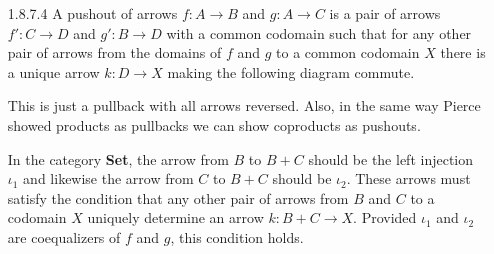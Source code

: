 \documentclass{article}
\begin{document}
\begin{enumerate}
\newpage
\item [1.8.7.4]
  A pushout of arrows $f : A \rightarrow B$ and $g : A \rightarrow C$ is a pair of arrows $f' : C \rightarrow D$ and $g' : B \rightarrow D$ with a common codomain such that for any other pair of arrows from the domains of $f$ and $g$ to a common codomain $X$ there is a unique arrow $k : D \rightarrow X$ making the following diagram commute.
  \begin{center}
  \end{center}

  This is just a pullback with all arrows reversed.
  Also, in the same way Pierce showed products as pullbacks we can show coproducts as pushouts.
  \begin{center}
  \end{center}

  In the category \textbf{Set}, the arrow from $B$ to $B+C$ should be the left injection $\iota_1$ and likewise the arrow from $C$ to $B+C$ should be $\iota_2$.
  These arrows must satisfy the condition that any other pair of arrows from $B$ and $C$ to a codomain $X$ uniquely determine an arrow $k : B+C \rightarrow X$.
  Provided $\iota_1$ and $\iota_2$ are coequalizers of $f$ and $g$, this condition holds.
  

\end{enumerate}
\end{document}
